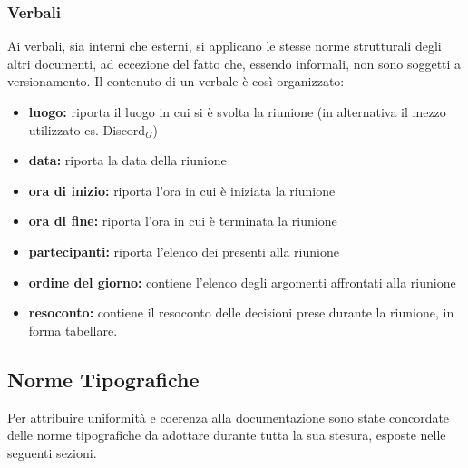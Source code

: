 \subsubsection{Verbali}\label{ProcessiDiSupportoDocumentazioneStrutturaGeneraleDeiDocumentiVerbali}
Ai verbali, sia interni che esterni, si applicano le stesse norme strutturali degli altri documenti, ad eccezione del fatto che, essendo informali, non sono soggetti a versionamento. Il contenuto di un verbale è così organizzato:
\begin{itemize}
\item \textbf{luogo:} riporta il luogo in cui si è svolta la riunione (in alternativa il mezzo utilizzato es. Discord$_G$)
	\item \textbf{data:} riporta la data della riunione
		\item \textbf{ora di inizio:} riporta l'ora in cui è iniziata la riunione
			\item \textbf{ora di fine:} riporta l'ora in cui è terminata la riunione
				\item \textbf{partecipanti:} riporta l'elenco dei presenti alla riunione
					\item \textbf{ordine del giorno:} contiene l'elenco degli argomenti affrontati alla riunione
						\item \textbf{resoconto:}  contiene il resoconto delle decisioni prese durante la riunione, in forma tabellare.
\end{itemize}
\subsection{Norme Tipografiche}\label{ProcessiDiSupportoDocumentazioneNormeTipografiche}
\label{sec:NormeTipografiche}
Per attribuire uniformità e coerenza alla documentazione sono state concordate  delle norme tipografiche da adottare durante tutta la sua stesura, esposte nelle seguenti sezioni.
